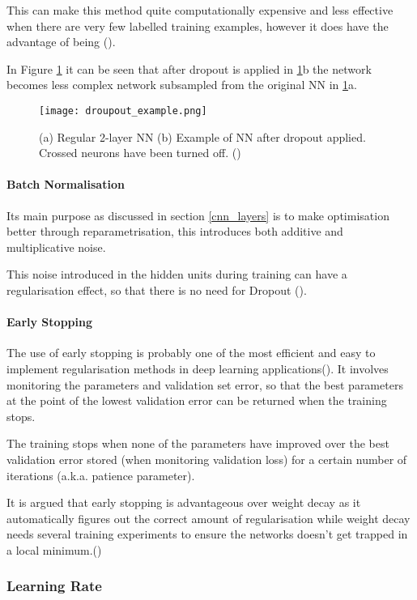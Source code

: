 This can make this method quite computationally expensive and less effective when there are very few labelled training examples, however it does have the advantage of being (\cite{GoodBengCour16}).

In Figure \ref{fig_dropout} it can be seen that after dropout is applied in \ref{fig_dropout}b the network becomes less complex network subsampled from the original \gls{NN} in \ref{fig_dropout}a.

    \begin{figure}[hbt!]
        \centering
        \texttt{[image: droupout\_example.png]}
        \caption{(a) Regular 2-layer \gls{NN} (b) Example of \gls{NN} after dropout applied. Crossed neurons have been turned off. (\cite{shanmugamani2018deep})}
        \label{fig_dropout}
    \end{figure}
\paragraph{Batch Normalisation}
Its main purpose as discussed in section \ref{cnn_layers} is to make optimisation better through reparametrisation, this introduces both additive and multiplicative noise.

This noise introduced in the hidden units during training can have a regularisation effect, so that there is no need for Dropout (\cite{GoodBengCour16}).
\paragraph{Early Stopping} 
The use of early stopping is probably one of the most efficient and easy to implement regularisation methods in deep learning applications(\cite{GoodBengCour16}). It involves monitoring the parameters and validation set error, so that the best parameters at the point of the lowest validation error can be returned when the training stops. 

The training stops when none of the parameters have improved over the best validation error stored (when monitoring validation loss) for a certain number of iterations (\gls{a.k.a.} patience parameter).

It is argued that early stopping is advantageous over weight decay as it automatically figures out the correct amount of regularisation while weight decay needs several training experiments to ensure the networks doesn't get trapped in a local minimum.(\cite{GoodBengCour16}) 

\subsubsection{Learning Rate} \label{learning_rate}

